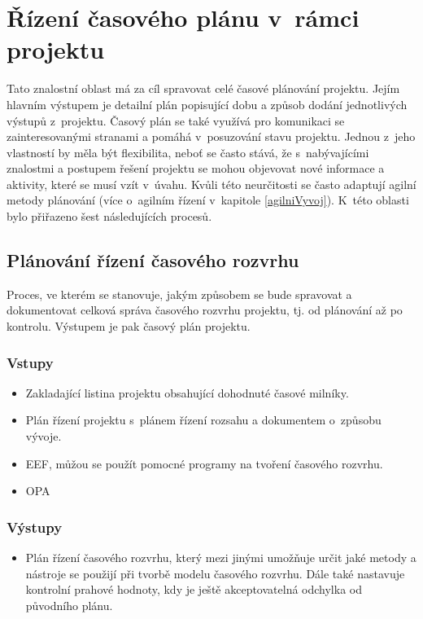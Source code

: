 \section{Řízení časového plánu v~rámci projektu}

Tato znalostní oblast má za cíl spravovat celé časové plánování projektu. Jejím hlavním výstupem je detailní plán popisující dobu a způsob dodání jednotlivých výstupů z~projektu. Časový plán se také využívá pro komunikaci se zainteresovanými stranami a pomáhá v~posuzování stavu projektu. Jednou z~jeho vlastností by měla být flexibilita, neboť se často stává, že s~nabývajícími znalostmi a postupem řešení projektu se mohou objevovat nové informace a aktivity, které se musí vzít v~úvahu. Kvůli této neurčitosti se často adaptují agilní metody plánování (více o~agilním řízení v~kapitole \ref{agilniVyvoj}). K~této oblasti bylo přiřazeno šest následujících procesů.

\subsection*{Plánování řízení časového rozvrhu}

Proces, ve kterém se stanovuje, jakým způsobem se bude spravovat a dokumentovat celková správa časového rozvrhu projektu, tj. od plánování až po kontrolu. Výstupem je pak časový plán projektu.

\subsubsection*{Vstupy}
\begin{itemize}
    \item Zakladající listina projektu obsahující dohodnuté časové milníky.
    \item Plán řízení projektu s~plánem řízení rozsahu a dokumentem o~způsobu vývoje.
    \item EEF, můžou se použít pomocné programy na tvoření časového rozvrhu.
    \item OPA
\end{itemize}
\subsubsection*{Výstupy}
\begin{itemize}
    \item Plán řízení časového rozvrhu, který mezi jinými umožňuje určit jaké metody a nástroje se použijí při tvorbě modelu časového rozvrhu. Dále také nastavuje kontrolní prahové hodnoty, kdy je ještě akceptovatelná odchylka od původního plánu.
\end{itemize}

